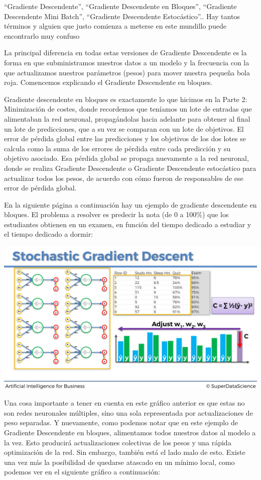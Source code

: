 \documentclass[
]{book}
\begin{document}
``Gradiente Descendente'', ``Gradiente Descendente en Bloques'', ``Gradiente Descendente Mini Batch'', ``Gradiente Descendente Estocástico''.. Hay tantos términos y alguien que justo comienza a meterse en este mundillo puede encontrarlo muy confuso

La principal diferencia en todas estas versiones de Gradiente Descendente es la forma en que subministramos nuestros datos a un modelo y la frecuencia con la que actualizamos nuestros parámetros (pesos) para mover nuestra pequeña bola roja. Comencemos explicando el Gradiente Descendente en bloques.

Gradiente descendente en bloques es exactamente lo que hicimos en la Parte 2: Minimización de costes, donde recordemos que teníamos un lote de entradas que alimentaban la red neuronal, propagándolas hacia adelante para obtener al final un lote de predicciones, que a su vez se comparan con un lote de objetivos. El error de pérdida global entre las predicciones y los objetivos de los dos lotes se calcula como la suma de los errores de pérdida entre cada predicción y su objetivo asociado. Esa pérdida global se propaga nuevamente a la red neuronal, donde se realiza Gradiente Descendente o Gradiente Descendente estocástico para actualizar todos los pesos, de acuerdo con cómo fueron de responsables de ese error de pérdida global.

En la siguiente página a continuación hay un ejemplo de gradiente descendente en bloques. El problema a resolver es predecir la nota (de 0 a 100\%) que los estudiantes obtienen en un examen, en función del tiempo dedicado a estudiar y el tiempo dedicado a dormir:

\includegraphics{Images/ANN_26.png}

Una cosa importante a tener en cuenta en este gráfico anterior es que estas no son redes neuronales múltiples, sino una sola representada por actualizaciones de peso separadas. Y nuevamente, como podemos notar que en este ejemplo de Gradiente Descendente en bloques, alimentamos todos nuestros datos al modelo a la vez. Esto producirá actualizaciones colectivas de los pesos y una rápida optimización de la red. Sin embargo, también está el lado malo de esto. Existe una vez más la posibilidad de quedarse atascado en un mínimo local, como podemos ver en el siguiente gráfico a continuación:
\end{document}
